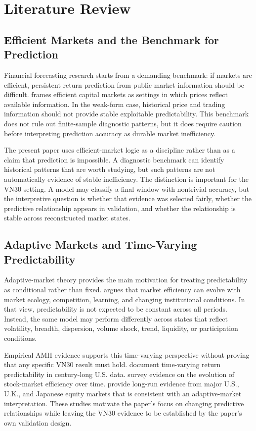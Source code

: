 \documentclass[12pt,a4paper]{article}
\begin{document}
\section{Literature Review}

\subsection{Efficient Markets and the Benchmark for Prediction}

Financial forecasting research starts from a demanding benchmark: if markets are efficient, persistent return prediction from public market information should be difficult. \citet{Fama1970} frames efficient capital markets as settings in which prices reflect available information. In the weak-form case, historical price and trading information should not provide stable exploitable predictability. This benchmark does not rule out finite-sample diagnostic patterns, but it does require caution before interpreting prediction accuracy as durable market inefficiency.

The present paper uses efficient-market logic as a discipline rather than as a claim that prediction is impossible. A diagnostic benchmark can identify historical patterns that are worth studying, but such patterns are not automatically evidence of stable inefficiency. The distinction is important for the VN30 setting. A model may classify a final window with nontrivial accuracy, but the interpretive question is whether that evidence was selected fairly, whether the predictive relationship appears in validation, and whether the relationship is stable across reconstructed market states.

\subsection{Adaptive Markets and Time-Varying Predictability}

Adaptive-market theory provides the main motivation for treating predictability as conditional rather than fixed. \citet{Lo2004} argues that market efficiency can evolve with market ecology, competition, learning, and changing institutional conditions. In that view, predictability is not expected to be constant across all periods. Instead, the same model may perform differently across states that reflect volatility, breadth, dispersion, volume shock, trend, liquidity, or participation conditions.

Empirical AMH evidence supports this time-varying perspective without proving that any specific VN30 result must hold. \citet{KimShamsuddinLim2011} document time-varying return predictability in century-long U.S. data. \citet{LimBrooks2011} survey evidence on the evolution of stock-market efficiency over time. \citet{UrquhartHudson2013} provide long-run evidence from major U.S., U.K., and Japanese equity markets that is consistent with an adaptive-market interpretation. These studies motivate the paper's focus on changing predictive relationships while leaving the VN30 evidence to be established by the paper's own validation design.
\end{document}
